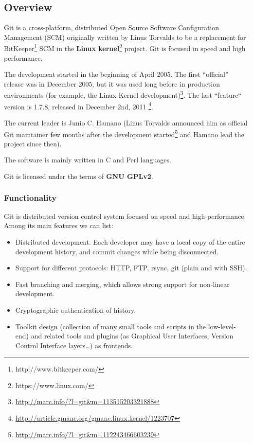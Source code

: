 \documentclass[a4paper,10pt]{article}
\begin{document}
\subsection{Overview}
Git\cite{Git} is a cross-platform, distributed Open Source Software
Configuration Management (SCM) originally written by Linus Torvalds to be a
replacement for BitKeeper\footnote{http://www.bitkeeper.com/} SCM in the
\textbf{Linux kernel}\footnote{https://www.linux.com/} project. Git is focused
in speed and high performance.

The development started in the beginning of April 2005. The first ``official''
release was in December 2005, but it was used long before in production
environments (for
example, the Linux
Kernel development)\footnote{\url{http://marc.info/?l=git&m=113515203321888}}.
The last ``feature`` version is 1.7.8, released in December 2nd, 2011
\footnote{\url{http://article.gmane.org/gmane.linux.kernel/1223707}}.

The current leader is Junio C. Hamano (Linus Torvalds announced him as official
Git maintainer few months after the development
 started\footnote{\url{http://marc.info/?l=git&m=112243466603239}} and Hamano
lead the project since then). 

The software is mainly written in C and Perl languages.

Git is licensed under the terms of \textbf{GNU GPLv2}.

\subsubsection{Functionality}

Git is distributed version control system focused on speed and
high-performance. Among its main features we can list:
\begin{itemize}
 \item Distributed development. Each developer may have a local copy of the
entire development history, and commit changes while being disconnected.
 \item Support for different protocols: HTTP, FTP, rsync, git (plain and with
SSH).
\item Fast branching and merging, which allows strong support for non-linear
development.
\item Cryptographic authentication of history.
\item Toolkit design (collection of many small tools and scripts in the
low-level-end) and related tools and plugins (as Graphical User Interfaces,
Version Control Interface layers\dots) as frontends.
\end{itemize}
\end{document}
